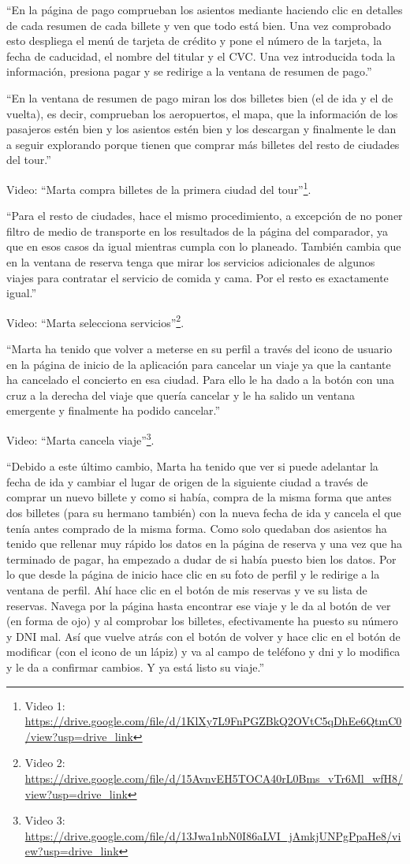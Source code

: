 ``En la página de pago comprueban los asientos mediante haciendo clic en detalles de cada resumen de cada billete y ven que todo está bien. Una vez comprobado esto despliega el menú de tarjeta de crédito y pone el número de la tarjeta, la fecha de caducidad, el nombre del titular y el CVC. Una vez introducida toda la información, presiona pagar y se redirige a la ventana de resumen de pago.''

``En la ventana de resumen de pago miran los dos billetes bien (el de ida y el de vuelta), es decir, comprueban los aeropuertos, el mapa, que la información de los pasajeros estén bien y los asientos estén bien y los descargan y finalmente le dan a seguir explorando porque tienen que comprar más billetes del resto de ciudades del tour.''

Video: ``Marta compra billetes de la primera ciudad del tour''\footnote{Video 1: \url{https://drive.google.com/file/d/1KlXy7L9FnPGZBkQ2OVtC5qDhEe6QtmC0/view?usp=drive_link}}.

``Para el resto de ciudades, hace el mismo procedimiento, a excepción de no poner filtro de medio de transporte en los resultados de la página del comparador, ya que en esos casos da igual mientras cumpla con lo planeado. También cambia que en la ventana de reserva tenga que mirar los servicios adicionales de algunos viajes para contratar el servicio de comida y cama. Por el resto es exactamente igual.''

Video: ``Marta selecciona servicios''\footnote{Video 2: \url{https://drive.google.com/file/d/15AvnvEH5TOCA40rL0Bms_vTr6Ml_wfH8/view?usp=drive_link}}.

``Marta ha tenido que volver a meterse en su perfil a través del icono de usuario en la página de inicio de la aplicación para cancelar un viaje ya que la cantante ha cancelado el concierto en esa ciudad. Para ello le ha dado a la botón con una cruz a la derecha del viaje que quería cancelar y le ha salido un ventana emergente y finalmente ha podido cancelar.''

Video: ``Marta cancela viaje''\footnote{Video 3: \url{https://drive.google.com/file/d/13Jwa1nbN0I86aLVI_jAmkjUNPgPpaHe8/view?usp=drive_link}}.

``Debido a este último cambio, Marta ha tenido que ver si puede adelantar la fecha de ida y cambiar el lugar de origen de la siguiente ciudad a través de comprar un nuevo billete y como si había, compra de la misma forma que antes dos billetes (para su hermano también) con la nueva fecha de ida y cancela el que tenía antes comprado de la misma forma. Como solo quedaban dos asientos ha tenido que rellenar muy rápido los datos en la página de reserva y una vez que ha terminado de pagar, ha empezado a dudar de si había puesto bien los datos. Por lo que desde la página de inicio hace clic en su foto de perfil y le redirige a la ventana de perfil. Ahí hace clic en el botón de mis reservas y ve su lista de reservas. Navega por la página hasta encontrar ese viaje y le da al botón de ver (en forma de ojo) y al comprobar los billetes, efectivamente ha puesto su número y DNI mal. Así que vuelve atrás con el botón de volver y hace clic en el botón de modificar (con el icono de un lápiz) y va al campo de teléfono y dni y lo modifica y le da a confirmar cambios. Y ya está listo su viaje.''

